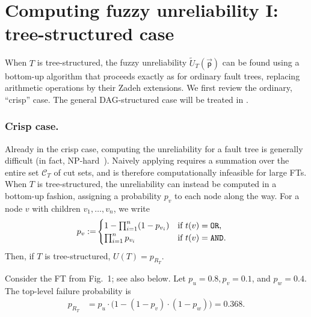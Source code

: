 \documentclass[runningheads]{llncs}
\begin{document}
\section{Computing fuzzy unreliability I: tree-structured case}\label{sec:tree-str-calc}

When $T$ is tree-structured, the fuzzy unreliability $\tilde{U}_T(\vec{\mathsf{p}})$ can be found using a bottom-up algorithm that proceeds exactly as for ordinary fault trees, replacing arithmetic operations by their Zadeh extensions.
We first review the ordinary, ``crisp'' case.
The general DAG-structured case will be treated in .
\subsubsection{Crisp case.}\label{sec:bottom-up-ordinary-fts}
Already in the crisp case, computing the unreliability for a fault tree is generally difficult (in fact, NP-hard~\cite{lopuhaazwakenberg2023ftreliability}). 
Naively applying  requires a summation over the entire set $\mathcal{C}_T$ of cut sets, and is therefore computationally infeasible for large FTs. 
When $T$ is tree-structured, the unreliability can instead be computed in a bottom-up fashion, assigning a probability $p_v$ to each node along the way. 
For a node $v$ with children $v_1,\ldots,v_n$, we write
\begin{align} 
p_v :=&
\begin{cases}\label{eq:prob_laws}
    1 - \prod_{i=1}^{n} (1 - p_{v_i})  & \parbox{55pt}{if~$t(v)=\mathtt{OR}$,}\\
    \prod_{i=1}^{n} p_{v_i}  & \parbox{55pt}{if~$t(v)=\mathtt{AND}$}.
\end{cases} 
\end{align}
Then, if $T$ is tree-structured, $U(T)=p_{R_T}$.
\begin{example}\label{ex:compute_probability}
    Consider the FT from Fig.~1; see also below. Let $p_u=0.8, p_v=0.1$, and $p_w=0.4$. The top-level failure probability is    
    \begin{align*}
        p_{R_T} &= p_u \cdot \bigl(1 - (1 - p_v) \cdot (1 - p_w) \bigr) = 0.368.
    \end{align*}
\end{example}
\end{document}
